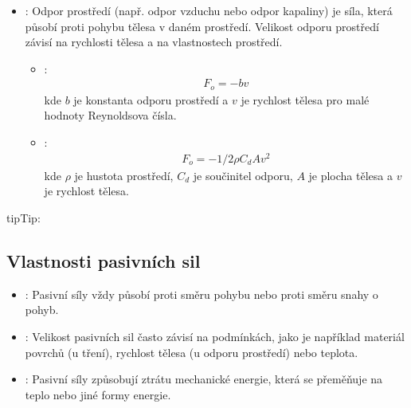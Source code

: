 \documentclass[letterpaper,10pt,english]{jupyterBook}
\begin{document}
\sphinxAtStartPar
{}
\begin{itemize}
\item {} 
\sphinxAtStartPar
{}: Odpor prostředí (např. odpor vzduchu nebo odpor kapaliny) je síla, která působí proti pohybu tělesa v daném prostředí. Velikost odporu prostředí závisí na rychlosti tělesa a na vlastnostech prostředí.
\begin{itemize}
\item {} 
\sphinxAtStartPar
{}:
\begin{equation*}
\begin{split}F_o = -b  v\end{split}
\end{equation*}
\sphinxAtStartPar
kde \(b\) je konstanta odporu prostředí a \(v\) je rychlost tělesa pro malé hodnoty Reynoldsova čísla.

\item {} 
\sphinxAtStartPar
{}:
\begin{equation*}
\begin{split}F_o = -1/2  \rho  C_d  A  v^2\end{split}
\end{equation*}
\sphinxAtStartPar
kde \(\rho\) je hustota prostředí, \(C_d\) je součinitel odporu, \(A\) je plocha tělesa a \(v\) je rychlost tělesa.

\end{itemize}

\end{itemize}

\begin{sphinxadmonition}{tip}{Tip:}
\sphinxAtStartPar
{}
\end{sphinxadmonition}


\subsection{Vlastnosti pasivních sil}
\label{\detokenize{Prednasky/1_3_Dynamika_pohybu_v_1D:vlastnosti-pasivnich-sil}}\begin{itemize}
\item {} 
\sphinxAtStartPar
{}: Pasivní síly vždy působí proti směru pohybu nebo proti směru snahy o pohyb.

\item {} 
\sphinxAtStartPar
{}: Velikost pasivních sil často závisí na podmínkách, jako je například materiál povrchů (u tření), rychlost tělesa (u odporu prostředí) nebo teplota.

\item {} 
\sphinxAtStartPar
{}: Pasivní síly způsobují ztrátu mechanické energie, která se přeměňuje na teplo nebo jiné formy energie.

\end{itemize}
\end{document}
